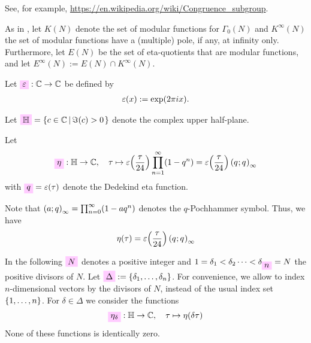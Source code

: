 \documentclass{article}
\begin{document}
See, for example,
\url{https://en.wikipedia.org/wiki/Congruence_subgroup}.

As in \cite{Radu:RamanujanKolberg:2015}, let $K(N)$ denote the set of
modular functions for $\Gamma_0(N)$ and $K^\infty(N)$ the set of
modular functions have a (multiple) pole, if any, at infinity only.
Furthermore, let $E(N)$ be the set of eta-quotients that are
modular functions, and let $E^\infty(N) := E(N)\cap K^\infty(N)$.

\begin{Definition}\label{def:epsilon}
  Let $\defineNotation[epsilon]{\unityPowerSymbol}: \setC \to \setC$
  be defined by
  \begin{gather*}
    \varepsilon\!\left(x\right) := \exp(2\pi i x).
  \end{gather*}
\end{Definition}

Let $\defineNotation[H]{\setH}=\SetDef{c\in \setC}{\Im(c)>0}$ denote
the complex upper half-plane.

Let
\begin{gather}\label{eq:eta-expansion}
  \defineNotation[eta]{\eta}: \setH \to \setC, \quad
  \tau \mapsto \unityPower{\frac{\tau}{24}} \prod_{n=1}^{\infty}(1-q^n)
  =
  \unityPower{\frac{\tau}{24}} \eulerFunction{}
\end{gather}
with $\defineNotation[q]{q} = \unityPower{\tau}$
denote the Dedekind eta function.

Note that $\left( a;q \right)_{\infty} = \prod_{n=0}^{\infty}(1-aq^n)$ denotes
the $q$-Pochhammer symbol. Thus, we have
\begin{gather*}
  \eta(\tau) = \varepsilon\!\left(\frac{\tau}{24}\right) \left( q^{};q^{} \right)_{\infty}
\end{gather*}

In the following $\defineNotation[N]{N}$ denotes a positive integer
and $1=\delta_1<\delta_2\dots<\delta_{\defineNotation[n]{n}}=N$ the
positive divisors of $N$. Let
$\defineNotation[Delta]{\Delta}:=\Set{\delta_1,\ldots,\delta_n}$. For
convenience, we allow to index $n$-dimensional vectors by the divisors
of $N$, instead of the usual index set $\left\{1,\ldots,n\right\}$.
%
For $\delta\in\Delta$ we consider the functions
\begin{gather*}
  \defineNotation[eta-delta]{\eta_\delta}: \setH \to \setC,\quad \tau
  \mapsto \eta(\delta\tau)
\end{gather*}
None of these functions is identically zero.
\end{document}
